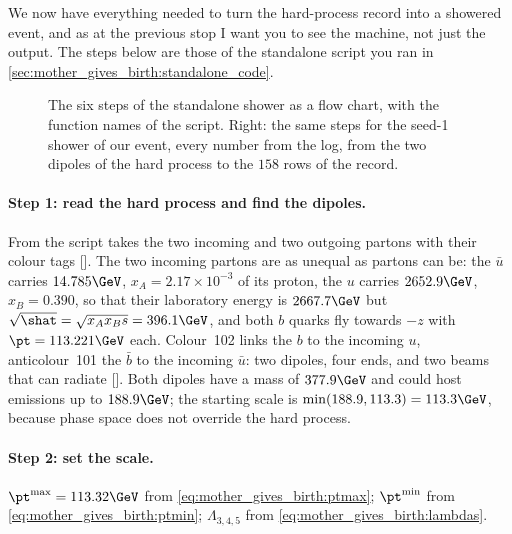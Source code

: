 We now have everything needed to turn the hard-process record into a
showered event, and as at the previous stop I want you to see the machine,
not just the output. The steps below are those of the standalone script
you ran in \cref{sec:mother_gives_birth:standalone_code}.

\begin{figure}[htbp]\centering
\resizebox{\textwidth}{!}{}
\caption[The six steps of the shower, with the numbers of our event]{The six steps of the standalone shower as a flow chart, with the function names of the script. Right: the same steps for the seed-1 shower of our event, every number from the  log, from the two dipoles of the hard process to the $158$ rows of the record.}
\label{fig:mother_gives_birth:shower_flow}
\end{figure}

\paragraph{Step 1: read the hard process and find the dipoles.} From
 the script takes the two incoming and two outgoing
partons with their colour tags []. The two incoming
partons are as unequal as partons can be: the $\bar u$ carries
$14.785\GeV$, $x_A=2.17\times10^{-3}$ of its proton, the $u$ carries
$2652.9\GeV$, $x_B=0.390$, so that their laboratory energy is
$2667.7\GeV$ but $\sqrt{\shat}=\sqrt{x_Ax_Bs}=396.1\GeV$, and both $b$
quarks fly towards $-z$ with $\pt=113.221\GeV$ each. Colour~102 links the $b$
to the incoming $u$, anticolour~101 the $\bar b$ to the incoming $\bar u$:
two dipoles, four ends, and two beams that can radiate
[]. Both dipoles have a mass of $377.9\GeV$ and could
host emissions up to $188.9\GeV$; the starting scale is
$\min(188.9,113.3)=113.3\GeV$, because phase space does not override the
hard process.

\paragraph{Step 2: set the scale.} $\pt^{\max}=113.32\GeV$ from
\cref{eq:mother_gives_birth:ptmax}; $\pt^{\min}$ from
\cref{eq:mother_gives_birth:ptmin}; $\Lambda_{3,4,5}$ from
\cref{eq:mother_gives_birth:lambdas}.


